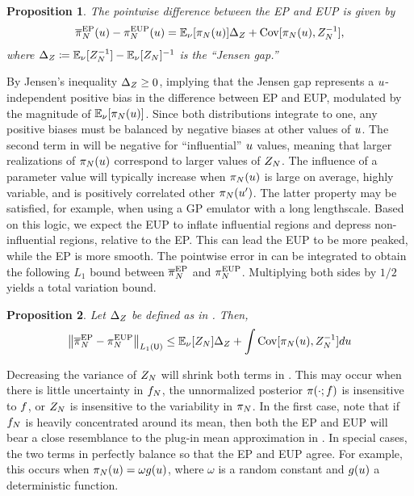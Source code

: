 \documentclass[12pt]{article}
\newtheorem{prop}{Proposition}
\begin{document}
\begin{prop} \label{prop:ep-eup-pw-err}
The pointwise difference between the EP and EUP is given by
\begin{equation}
\overline{\pi}_{N}^{\mathrm{EP}}(u) - \pi_{N}^{\mathrm{EUP}}(u)
= \mathbb{E}_{\nu_{}}[\pi_{N}(u)] \Delta_Z + \mathrm{Cov}[\pi_{N}(u), Z_{N}^{-1}],
\label{eq:ep-eup-pw-err}
\end{equation}
where $\Delta_Z \coloneqq \mathbb{E}_{\nu_{}}[Z_{N}^{-1}] - \mathbb{E}_{\nu_{}}[Z_{N}]^{-1}$
is the ``Jensen gap.''
\end{prop}

By Jensen's inequality $\Delta_Z \geq 0$, implying that the Jensen gap represents a 
$u$-independent positive bias in the difference between EP and EUP, modulated by the magnitude of 
$\mathbb{E}_{\nu_{}}[\pi_{N}(u)]$. Since both distributions integrate to one, any positive 
biases must be balanced by negative biases at other values of $u$.
The second term in  will be negative for ``influential'' $u$ values, 
meaning that larger realizations of $\pi_{N}(u)$ correspond to larger values of 
$Z_{N}$. The influence of a parameter value will typically increase when 
$\pi_{N}(u)$ is large on average, highly variable, and is positively correlated other 
$\pi_{N}(u^\prime)$. The latter property may be satisfied, for example, when using 
a GP emulator with a long lengthscale. Based on this logic, we expect the EUP to inflate 
influential regions and depress non-influential regions, relative to the EP. This can lead 
the EUP to be more peaked, while the EP is more smooth. The pointwise error in 
 can be integrated to obtain the following $L_1$ bound 
between $\overline{\pi}_{N}^{\mathrm{EP}}$ and $\pi_{N}^{\mathrm{EUP}}$. Multiplying both sides by $1/2$
yields a total variation bound.

\begin{prop} \label{prop:ep-eup-TV-err}
Let $\Delta_Z$ be defined as in . Then,
\begin{equation}
\left\lVert\overline{\pi}_{N}^{\mathrm{EP}} - \pi_{N}^{\mathrm{EUP}}\right\rVert_{L_1(\mathsf{U})}
\leq \mathbb{E}_{\nu_{}}[Z_{N}] \Delta_Z + \int \mathrm{Cov}[\pi_{N}(u), Z_{N}^{-1}] du
\label{eq:ep-eup-TV-err}
\end{equation}
\end{prop}

Decreasing the variance of $Z_{N}$ will shrink both terms in 
. This may occur when there is little 
uncertainty in $f_{N}$, the unnormalized posterior $\pi(\cdot; f)$
is insensitive to $f$, or $Z_{N}$ is insensitive to the variability 
in $\pi_{N}$. In the first case, note that if $f_{N}$ is heavily 
concentrated around its mean, then both the EP and EUP will bear a close resemblance
to the plug-in mean approximation in .
In special cases, the two terms in  perfectly balance so that 
the EP and EUP agree. For example, this occurs when 
$\pi_{N}(u) = \omega g(u)$, where $\omega$ is a random constant and 
$g(u)$ a deterministic function. 
\end{document}
